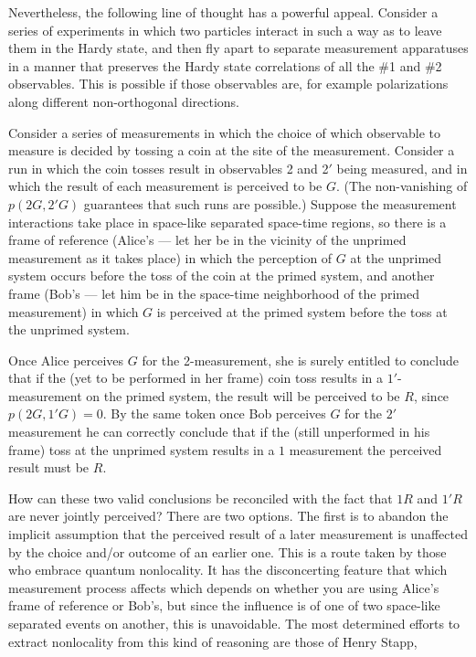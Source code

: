 Nevertheless, the following line of thought has a powerful appeal.
Consider a series of experiments in which two particles interact in
such a way as to leave them in the Hardy state, and then fly apart to
separate measurement apparatuses in a manner that preserves the Hardy
state correlations of all the \#1 and \#2 observables.  This is possible
if those observables are, for example polarizations along different
non-orthogonal directions.  

Consider a series of measurements in which the choice of which
observable to measure is decided by tossing a coin at the site of the
measurement.  Consider a run in which the coin tosses result
in observables 2 and 2$'$ being measured, and in which the result of
each measurement is perceived to be $G$.  (The non-vanishing of
$p(2G,2'G)$ guarantees that such runs are possible.)  Suppose the
measurement interactions take place in space-like separated space-time
regions, so there is a frame of reference (Alice's --- let her be
in the vicinity of the unprimed measurement as it takes place) in
which the perception of $G$ at the unprimed system occurs before the
toss of the coin at the primed system, and another frame (Bob's ---
let him be in the space-time neighborhood of the primed measurement) in
which $G$ is perceived at the primed system before the toss at the
unprimed system. 

Once Alice perceives $G$ for the 2-measurement, she is surely entitled
to conclude that if the (yet to be performed in her frame) coin toss
results in a $1'$-measurement on the primed system, the result will be
perceived to be $R$, since $p(2G,1'G) = 0.$ By the same token once Bob
perceives $G$ for the $2'$ measurement he can correctly conclude that
if the (still unperformed in his frame) toss at the unprimed system
results in a $1$ measurement the perceived result must be $R$.  

How can these two valid conclusions be reconciled with the fact that
$1R$ and $1'R$ are never jointly perceived? There are two options.
The first is to abandon the implicit assumption that the perceived
result of a later measurement is unaffected by the choice and/or
outcome of an earlier one.  This is a route taken by those who
embrace quantum nonlocality.  It has the disconcerting feature that
which measurement process affects which depends on whether you are
using Alice's frame of reference or Bob's, but since the influence is
of one of two space-like separated events on another, this is
unavoidable.  The most determined efforts to extract nonlocality from
this kind of reasoning are those of Henry Stapp,\fn

